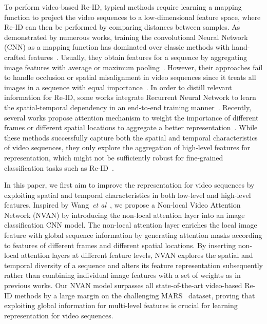 \documentclass{bmvc2k}
\newcommand{\revctliu}[1]{#1}
\newcommand{\revctliu}[1]{\textcolor{brown}{#1}}
\def\etal{\emph{et al}\bmvaOneDot}
\begin{document}
To perform video-based Re-ID, typical methods require learning a mapping function to project the video sequences to a low-dimensional feature space, where Re-ID can then be performed by comparing distances between samples.
As demonstrated by numerous works, training the convolutional Neural Network (CNN) as a mapping function has dominated over classic methods with hand-crafted features~\cite{sdalf,lomo,kissme}.
Usually, they obtain features for a sequence by aggregating image features with average or maximum pooling~\cite{rcnn,mars}.
However, their approaches fail to handle occlusion or spatial misalignment in video sequences since it treats all images in a sequence with equal importance~\cite{snip}.
In order to distill relevant information for Re-ID, \revctliu{some works integrate Recurrent Neural Network to learn the spatial-temporal dependency in an end-to-end training manner~\cite{rcnn,recurrent,deepfusion}.} Recently, several works propose attention mechanism to weight the importance of different frames or different spatial locations to aggregate a better representation~\cite{diversity,snip,sta}.
While these methods successfully capture both the spatial and temporal characteristics of video sequences, they only explore the aggregation of high-level features for representation, which might not be sufficiently robust for fine-grained classification tasks such as Re-ID~\cite{HACNN,yu2018hierarchical,shih2017deep}.



In this paper, we first aim to improve the representation for video sequences by exploiting spatial and temporal characteristics in both low-level and high-level features.
Inspired by Wang~\etal~\cite{non-local}, we propose a Non-local Video Attention Network (NVAN) by introducing the non-local attention layer into an image classification CNN model.
The non-local attention layer enriches the local image feature with global sequence information by generating attention masks according to features of different frames and different spatial locations.
By inserting non-local attention layers at different feature levels, NVAN explores the spatial and temporal diversity of a sequence and alters its feature representation subsequently rather than combining individual image features with a set of weights as in previous works.
Our NVAN model surpasses all state-of-the-art video-based Re-ID methods by a large margin on the challenging MARS~\cite{mars} dataset, proving that exploiting global information for multi-level features is crucial for learning representation for video sequences.
\end{document}
